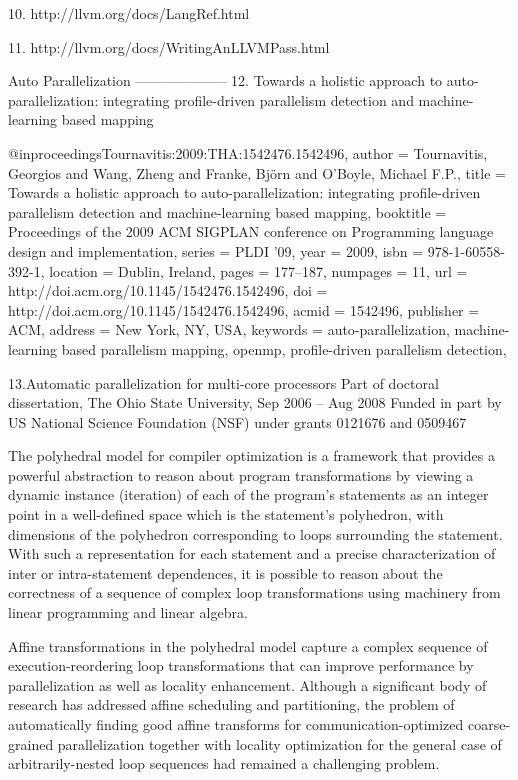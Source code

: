 10. http://llvm.org/docs/LangRef.html

11. http://llvm.org/docs/WritingAnLLVMPass.html

Auto Parallelization
--------------------
12. Towards a holistic approach to auto-parallelization: integrating profile-driven parallelism detection and machine-learning based mapping

@inproceedings{Tournavitis:2009:THA:1542476.1542496,
    author = {Tournavitis, Georgios and Wang, Zheng and Franke, Bj\"{o}rn and O'Boyle, Michael F.P.},
    title = {Towards a holistic approach to auto-parallelization: integrating profile-driven parallelism detection and machine-learning based mapping},
    booktitle = {Proceedings of the 2009 ACM SIGPLAN conference on Programming language design and implementation},
    series = {PLDI '09},
    year = {2009},
    isbn = {978-1-60558-392-1},
    location = {Dublin, Ireland},
    pages = {177--187},
    numpages = {11},
    url = {http://doi.acm.org/10.1145/1542476.1542496},
    doi = {http://doi.acm.org/10.1145/1542476.1542496},
    acmid = {1542496},
    publisher = {ACM},
    address = {New York, NY, USA},
    keywords = {auto-parallelization, machine-learning based parallelism mapping, openmp, profile-driven parallelism detection},
} 


13.Automatic parallelization for multi-core processors
Part of doctoral dissertation, The Ohio State University, Sep 
2006 -- Aug 2008
Funded in part by US National Science Foundation (NSF) under 
grants 0121676 and 0509467

The polyhedral model for compiler optimization is a framework that 
provides a powerful abstraction to reason about program transformations 
by viewing a dynamic instance (iteration) of each of the program's 
statements as an integer point in a well-defined space which is the 
statement's  polyhedron, with dimensions of the polyhedron corresponding 
to loops surrounding the statement. With such a representation for each 
statement and a precise characterization of inter or intra-statement 
dependences, it is possible to reason about the correctness of a sequence 
of complex loop transformations using machinery from linear programming 
and linear algebra.

Affine transformations in the polyhedral model capture a complex 
sequence of execution-reordering loop transformations that can improve 
performance by parallelization as well as locality enhancement. Although 
a significant body of research has addressed affine scheduling and 
partitioning, the problem of automatically finding good affine transforms 
for communication-optimized coarse-grained parallelization together with 
locality optimization for the general case of arbitrarily-nested loop 
sequences had remained a challenging problem.


